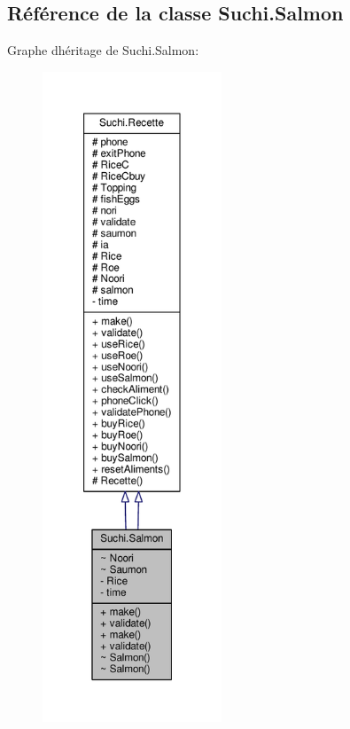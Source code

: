 \hypertarget{classSuchi_1_1Salmon}{}\subsection{Référence de la classe Suchi.\+Salmon}
\label{classSuchi_1_1Salmon}


Graphe d\textquotesingle{}héritage de Suchi.\+Salmon\+:\nopagebreak
\begin{figure}[H]
\begin{center}
\leavevmode
\includegraphics[height=550pt]{classSuchi_1_1Salmon__inherit__graph}
\end{center}
\end{figure}


